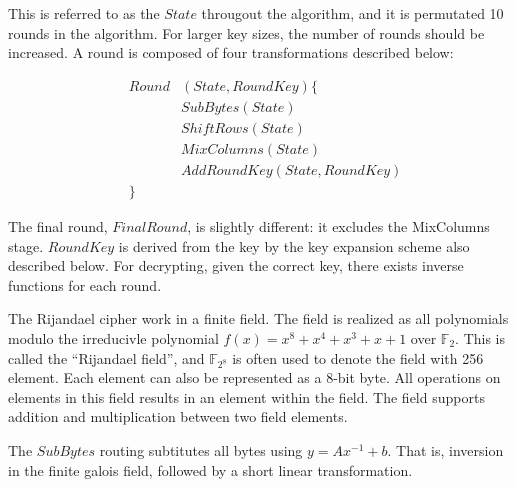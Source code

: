 This is referred to as the $State$ througout the algorithm, and it
is permutated 10 rounds in the algorithm. For larger key sizes, the
number of rounds should be increased. A round is composed of four
transformations described below:

\begin{eqnarray}
&Round&(State, RoundKey) \{\\
  & &SubBytes (State)\\
  & &ShiftRows (State)\\
  & &MixColumns (State)\\
  & &AddRoundKey (State, RoundKey)\\
&\}&
\end{eqnarray}

The final round, $FinalRound$, is slightly different: it excludes the
MixColumns stage. $RoundKey$ is derived from the key by the key
expansion scheme also described below. For decrypting, given the
correct key, there exists inverse functions for each round.

The Rijandael cipher work in a finite field. The field is realized as
all polynomials modulo the irreducivle polynomial $f(x) = x^8 + x^4 +
x^3 + x + 1$ over $\mathbb{F}_2$. This is called the ``Rijandael
field'', and $\mathbb{F}_{2^8}$ is often used to denote the field with
256 element. Each element can also be represented as a 8-bit byte. All
operations on elements in this field results in an element within the
field. The field supports addition and multiplication between two
field elements.

The $SubBytes$ routing subtitutes all bytes using $y = A x^{-1} + b$.
That is, inversion in the finite galois field, followed by a short
linear transformation.

